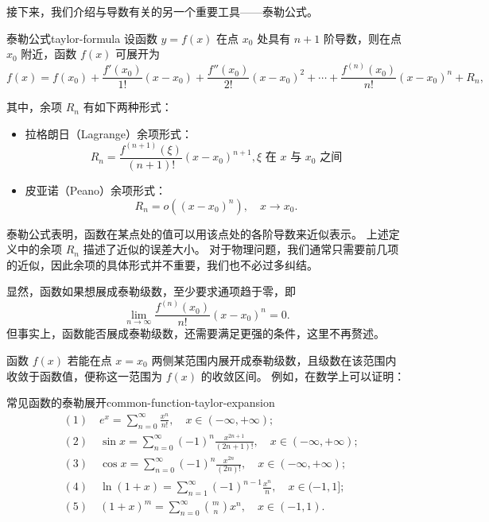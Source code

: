 接下来，我们介绍与导数有关的另一个重要工具——泰勒公式。
\begin{theorem}{泰勒公式}{taylor-formula}
    设函数 $ y = f(x) $ 在点 $ x_0 $ 处具有 $ n + 1 $ 阶导数，则在点 $ x_0 $ 附近，函数 $ f(x) $ 可展开为
    \begin{equation}
        f(x) = f(x_0) + \frac{f'(x_0)}{1!} (x - x_0) + \frac{f''(x_0)}{2!} (x - x_0)^2 + \cdots + \frac{f^{(n)}(x_0)}{n!} (x - x_0)^n + R_n,
    \end{equation}

    其中，余项 $ R_n $ 有如下两种形式：
    \begin{itemize}
        \item 拉格朗日（Lagrange）余项形式：
              \begin{equation}
                  R_n = \frac{f^{(n+1)}(\xi)}{(n+1)!} (x - x_0)^{n+1},\text{$\xi$ 在 $x$ 与 $x_0$ 之间}
              \end{equation}
        \item 皮亚诺（Peano）余项形式：
              \begin{equation}
                  R_n = o \left( (x - x_0)^n \right),\quad x \to x_0 .
              \end{equation}
    \end{itemize}

\end{theorem}

泰勒公式表明，函数在某点处的值可以用该点处的各阶导数来近似表示。
上述定义中的余项 $ R_n $ 描述了近似的误差大小。
对于物理问题，我们通常只需要前几项的近似，因此余项的具体形式并不重要，我们也不必过多纠结。

显然，函数如果想展成泰勒级数，至少要求通项趋于零，即
\begin{equation*}
    \lim_{n \to \infty} \frac{f^{(n)}(x_0)}{n!} (x - x_0)^n = 0.
\end{equation*}
但事实上，函数能否展成泰勒级数，还需要满足更强的条件，这里不再赘述。

\bigskip

函数 $ f(x) $ 若能在点 $ x = x_0 $ 两侧某范围内展开成泰勒级数，且级数在该范围内收敛于函数值，便称这一范围为 $ f(x) $ 的收敛区间。
例如，在数学上可以证明：
\begin{physlist}{常见函数的泰勒展开}{common-function-taylor-expansion}
    \begin{align}
         & (1)\quad e^x = \sum_{n=0}^{\infty} \frac{x^n}{n!},\quad x \in (-\infty, +\infty) ;                        \\
         & (2)\quad \sin x = \sum_{n=0}^{\infty} (-1)^n \frac{x^{2n+1}}{(2n+1)!},\quad x \in (-\infty, +\infty) ;    \\
         & (3)\quad \cos x = \sum_{n=0}^{\infty} (-1)^n \frac{x^{2n}}{(2n)!},\quad x \in (-\infty, +\infty) ;        \\
         & (4)\quad \ln (1 + x) = \sum_{n=1}^{\infty} (-1)^{n-1} \frac{x^n}{n},\quad x \in (-1, 1] ;                 \\
         & (5)\quad (1 + x)^m = \sum_{n=0}^{\infty} \binom{m}{n} x^n,\quad x \in (-1, 1) .\label{eq:taylor-binomial}
    \end{align}

\end{physlist}

